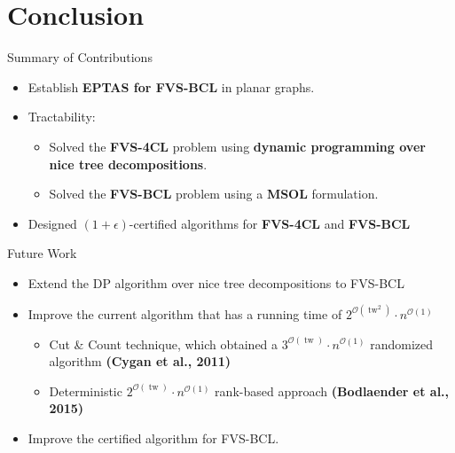 \documentclass{beamer}
\newcommand{\tw}{\operatorname{tw}}
\begin{document}
\section{Conclusion}

\begin{frame}{Summary of Contributions}
\begin{itemize}
    \item Establish \textbf{EPTAS for FVS-BCL} in planar graphs.
    \vspace{0.5em}
    \item Tractability:
    \begin{itemize}
      \item Solved the \textbf{FVS-4CL} problem using \textbf{dynamic programming over nice tree decompositions}.
      \item Solved the \textbf{FVS-BCL} problem using a \textbf{MSOL} formulation.
    \end{itemize}
    \vspace{0.5em}
    \item Designed $(1+\epsilon)$-certified algorithms for \textbf{FVS-4CL} and \textbf{FVS-BCL}

\end{itemize}
\end{frame}


\begin{frame}{Future Work}
  \begin{itemize}
    \item Extend the DP algorithm over nice tree decompositions to FVS-BCL
    \vspace{0.5em}
    \item Improve the current algorithm that has a running time of 
    $2^{\mathcal{O}(\tw^2)} \cdot n^{\mathcal{O}(1)}$
    \begin{itemize} 
    \item Cut \& Count technique, which obtained a 
    $3^{\mathcal{O}(\tw)} \cdot n^{\mathcal{O}(1)}$ randomized algorithm
    \textbf{(Cygan et al., 2011)}  

    \item Deterministic 
    $2^{\mathcal{O}(\tw)} \cdot n^{\mathcal{O}(1)}$ rank-based approach
    \textbf{(Bodlaender et al., 2015)}
    \end{itemize}
    \vspace{0.5em}
    \item  Improve the certified algorithm for FVS-BCL. 

  \end{itemize}
\end{frame}
\end{document}
